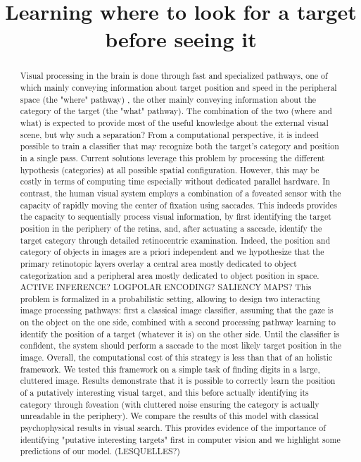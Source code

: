 \documentclass[a4]{article}
\title{
Learning where to look for a target before seeing it
}
\author{}
\begin{document}
\maketitle

\begin{abstract}
	
Visual processing in the brain is done through fast and specialized pathways, one of which mainly conveying information about target position and speed in the peripheral space (the "where" pathway) , the other mainly conveying  information about the category of the target (the "what" pathway). The combination of the two (where and what) is expected to provide most of the useful knowledge about the external visual scene, but why such a separation?
From a computational perspective, it is indeed possible to train a classifier that may recognize both the target's category and position in a single  pass. Current solutions leverage this problem by processing the different hypothesis (categories) at all possible spatial configuration. However, this may be costly in terms of computing time especially without dedicated parallel hardware.
In contrast, the human visual system employs a combination of a foveated sensor with the capacity of rapidly moving the center of fixation using saccades. This indeeds provides the capacity to sequentially process visual information, by first identifying the target position in the periphery of the retina, and, after actuating a saccade, identify the target category through detailed retinocentric examination. Indeed, the position and category of objects in images are a priori independent and we hypothesize that the primary retinotopic layers overlay a central area mostly dedicated to object categorization and a peripheral area mostly dedicated to object position in space.
ACTIVE INFERENCE?
LOGPOLAR ENCODING?
SALIENCY MAPS?
This problem is formalized in a probabilistic setting, allowing to design two interacting image processing pathways: first a classical image classifier, assuming that the gaze is  on the object on the one side, combined with a second processing pathway learning to identify the position of a target (whatever it is) on the other side. Until the classifier is confident, the system should perform a saccade to the most likely target position in the image. Overall, the computational cost of this strategy is less than that of an holistic framework.
We tested this framework on a simple task of finding digits in a large, cluttered image. Results demonstrate that it is possible to correctly learn the position of a putatively interesting visual target, and this before actually identifying its category through foveation (with cluttered noise ensuring the category is actually unreadable in the periphery). We compare the results of this model with classical psychophysical results in visual search. This provides evidence of the importance of identifying "putative interesting targets" first in computer vision and we highlight some predictions of our model. (LESQUELLES?)
\end{abstract}

\newpage


\newpage



\newpage


\newpage

\end{document}

